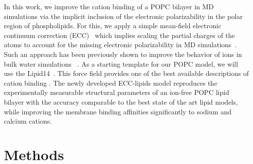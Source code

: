 \documentclass[aip,jcp,twocolumn]{revtex4}
\begin{document}



In this work, we improve the cation binding of a POPC bilayer in MD simulations via the implicit inclusion of the electronic polarizability in the polar region of phospholipids. For this, we apply a simple mean-field electronic continuum correction (ECC)~\cite{leontyev11} which implies scaling the partial charges of the atoms to account for the missing electronic polarizability in MD simulations~\cite{leontyev11}. Such an approach has been previously shown to improve the behavior of ions in bulk water simulations ~\cite{jungwirth17-new-paper-to-be-published, Pluharova2014, kohagen14, kohagen16}. As a starting template for our POPC model, we will use the Lipid14~\cite{dickson14}. This force field provides one of the best available descriptions of cation binding \cite{catte16}. The newly developed ECC-lipids model reproduces the experimentally
measurable structural parameters of an ion-free POPC lipid bilayer with the accuracy comparable to the best state of the art lipid models, while improving the membrane binding affinities significantly to sodium and calcium cations.



\section{Methods}
\end{document}
